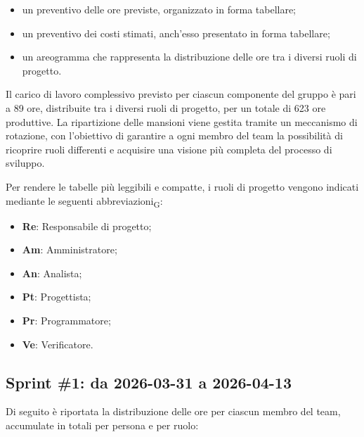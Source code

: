 ﻿\documentclass[a4paper, 10pt, colorlinks=true, linkcolor=black, urlcolor=blue, citecolor=blue, hidelinks]{article}
\begin{document}
\begin{itemize}
    \item un preventivo delle ore previste, organizzato in forma tabellare;
    \item un preventivo dei costi stimati, anch'esso presentato in forma tabellare;
    \item un areogramma che rappresenta la distribuzione delle ore tra i diversi ruoli di progetto.
\end{itemize}

Il carico di lavoro complessivo previsto per ciascun componente del gruppo è pari a 89 ore, distribuite tra i diversi ruoli di progetto, per un totale di 623 ore produttive. La ripartizione delle mansioni viene gestita tramite un meccanismo di rotazione, con l'obiettivo di garantire a ogni membro del team la possibilità di ricoprire ruoli differenti e acquisire una visione più completa del processo di sviluppo.

Per rendere le tabelle più leggibili e compatte, i ruoli di progetto vengono indicati mediante le seguenti abbreviazioni\textsubscript{G}:

\begin{itemize}
    \item \textbf{Re}: Responsabile di progetto;
    \item \textbf{Am}: Amministratore;
    \item \textbf{An}: Analista;
    \item \textbf{Pt}: Progettista;
    \item \textbf{Pr}: Programmatore;
    \item \textbf{Ve}: Verificatore.
\end{itemize}

\subsection{Sprint \#1: da 2026-03-31 a 2026-04-13}
Di seguito è riportata la distribuzione delle ore per ciascun membro del team,
accumulate in totali per persona e per ruolo:
\end{document}
